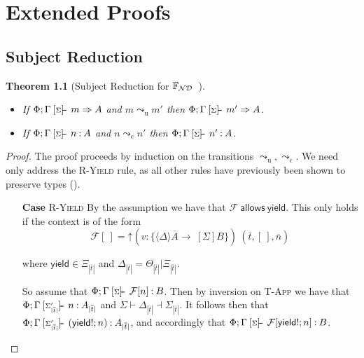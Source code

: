 \documentclass[msc,deptreport,cs]{infthesis} %
\newtheorem*{theorem*}{Theorem}
\newcommand\nondetfrank{$\mathbb{F}_{\cal{ND}}$}
\newcommand\yield{\textsf{yield}\xspace}
\newcommand\allows{\textsf{allows}\xspace}
\newcommand\Cse{\textbf{Case}}
\newcommand{\many}{\overline}
\newcommand{\sigentails}[1]{\mathbin{[{\text{\scriptsize ${#1}$}}]\hspace{-0.4ex}\text{-\!-}}\,}
\newcommand{\inferbase}[5]{#1; #3 \mathbin{#2} {#4} \Rightarrow {#5}}
\newcommand{\checkbase}[5]{#1; #3 \mathbin{#2} #5 \mathbin{:} #4}
\newcommand{\makes}[5]{\inferbase{#1}{\sigentails{#3}}{#2}{#4}{#5}}
\newcommand{\has}[5]{\checkbase{#1}{\sigentails{#3}}{#2}{#4}{#5}}
\newcommand{\checksk}{\has{\kenv}}
\newcommand{\inferskgs}{\makes{\kenv}{\Gamma}{\sigs}}
\newcommand{\checkskgs}{\has{\kenv}{\Gamma}{\sigs}}
\newcommand{\adj}{\Delta}
\newcommand{\adapt}{\Theta}
\newcommand{\ext}{\Xi}
\newcommand{\sigs}{\Sigma}
\newcommand{\thunk}[1]{\{{#1}\}}
\newcommand{\effin}[1]{\langle {#1} \rangle}
\newcommand{\effout}[1]{[{#1}]}
\newcommand{\EF}{\mathcal{F}}
\newcommand{\cu}{\mathord{\uparrow}}
\newcommand{\redtou}{\leadsto_{\mathrm{u}}}
\newcommand{\redtoc}{\leadsto_{\mathrm{c}}}
\newcommand{\kenv}{\Phi}  %
\newcommand{\adjact}[3]{{#1}\vdash{#2}\dashv{#3}}
\newcommand{\pipe}{\texttt{|}}
\begin{document}
\chapter{Extended Proofs}

\section{Subject Reduction}
\label{sec:subject-reduction-proofs}

\begin{theorem*}[Subject Reduction for \nondetfrank{}~]~

\begin{itemize}
\item If $\inferskgs{m}{A}$ and $m \redtou m'$ then $\inferskgs{m'}{A}$.
\item If $\checkskgs{A}{n}$ and $n \redtoc n'$ then $\checkskgs{A}{n'}$.
\end{itemize}
\end{theorem*}
\begin{proof}
  The proof proceeds by induction on the transitions $\redtou, \redtoc$. We need
  only address the \textsc{R-Yield} rule, as all other rules have previously
  been shown to preserve types (\cite{convent2020doo}).

  \begin{itemize}
    \item[\Cse] \textsc{R-Yield}
    By the assumption we have that $\EF~\allows~\yield$. This only holds if the context is of the form
    \[\EF[~] = \cu (v : \thunk{\many{\effin{\adj} A
          \to}~\effout{\sigs}B})~(\many{t},[~],\many{n})
      \]

      \noindent where $\yield \in \ext_{|\many{t}|}$ and
      $\adj_{|\many{t}|} = \adapt_{|\many{t}|}\pipe\ext_{|\many{t}|}$.

      So assume that $\checkskgs{B}{\EF[n]}$. Then by inversion on
      \textsc{T-App} we have that
      $\checksk{\Gamma}{\sigs'_{|\many{t}|}}{A_{|\many{t}|}}{n}$ and
      $\adjact{\sigs}{\adj_{|\many{t}|}}{\sigs_{|\many{t}|}}$. It follows then
      that
      $\checksk{\Gamma}{\sigs'_{|\many{t}|}}{A_{|\many{t}|}}{(\yield{}!; n)}$,
      and accordingly that $\checkskgs{B}{\EF[\yield{}!; n]}$.
  \end{itemize}

\end{proof}
\end{document}
